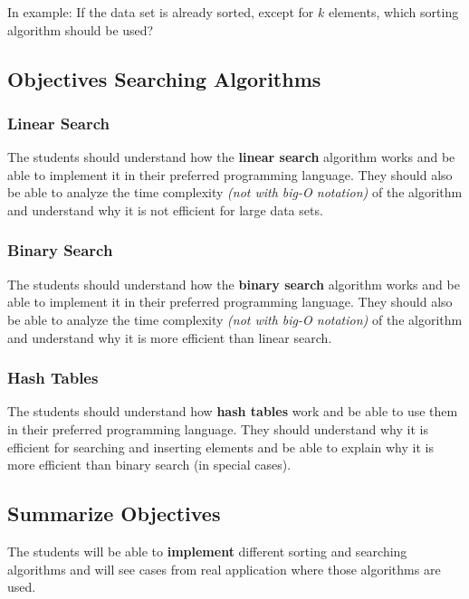 \documentclass[10pt, oneside]{article}
\theoremstyle{remark}
\begin{document}
In example: If the data set is already sorted, except for $k$ elements, which sorting algorithm should be used?

\subsection{Objectives Searching Algorithms}

\subsubsection{Linear Search}
The students should understand how the \textbf{linear search} algorithm works and be able to implement it in their preferred programming language. They should also be able to analyze the time complexity \textit{(not with big-O notation)} of the algorithm and understand why it is not efficient for large data sets.

\subsubsection{Binary Search}
The students should understand how the \textbf{binary search} algorithm works and be able to implement it in their preferred programming language. They should also be able to analyze the time complexity \textit{(not with big-O notation)} of the algorithm and understand why it is more efficient than linear search.

\subsubsection{Hash Tables}
The students should understand how \textbf{hash tables} work and be able to use them in their preferred programming language. They should understand why it is efficient for searching and inserting elements and be able to explain why it is more efficient than binary search (in special cases).

\subsection{Summarize Objectives}
The students will be able to \textbf{implement} different sorting and searching algorithms and will see cases from real application where those algorithms are used.
\end{document}
